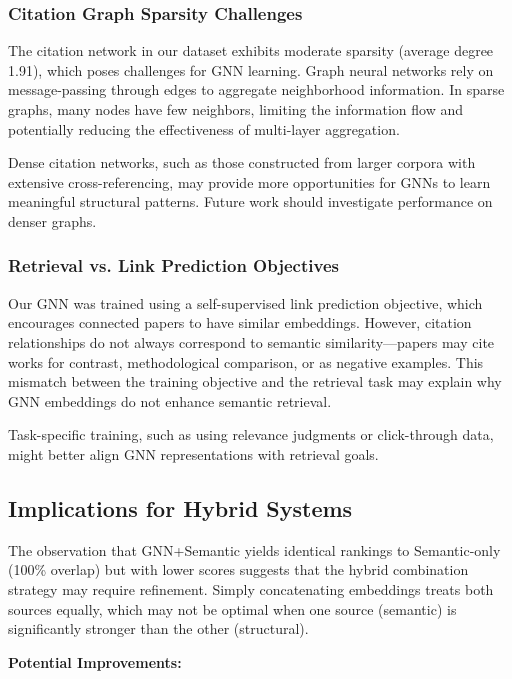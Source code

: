 \documentclass[pdflatex,sn-mathphys-num]{sn-jnl}
\theoremstyle{thmstyleone}%
\theoremstyle{thmstyletwo}%
\theoremstyle{thmstylethree}%
\begin{document}
\subsubsection{Citation Graph Sparsity Challenges}

The citation network in our dataset exhibits moderate sparsity (average degree 1.91), which poses challenges for GNN learning. Graph neural networks rely on message-passing through edges to aggregate neighborhood information. In sparse graphs, many nodes have few neighbors, limiting the information flow and potentially reducing the effectiveness of multi-layer aggregation.

Dense citation networks, such as those constructed from larger corpora with extensive cross-referencing, may provide more opportunities for GNNs to learn meaningful structural patterns. Future work should investigate performance on denser graphs.

\subsubsection{Retrieval vs. Link Prediction Objectives}

Our GNN was trained using a self-supervised link prediction objective, which encourages connected papers to have similar embeddings. However, citation relationships do not always correspond to semantic similarity—papers may cite works for contrast, methodological comparison, or as negative examples. This mismatch between the training objective and the retrieval task may explain why GNN embeddings do not enhance semantic retrieval.

Task-specific training, such as using relevance judgments or click-through data, might better align GNN representations with retrieval goals.

\subsection{Implications for Hybrid Systems}

The observation that GNN+Semantic yields identical rankings to Semantic-only (100\% overlap) but with lower scores suggests that the hybrid combination strategy may require refinement. Simply concatenating embeddings treats both sources equally, which may not be optimal when one source (semantic) is significantly stronger than the other (structural).

\textbf{Potential Improvements:}
\end{document}
